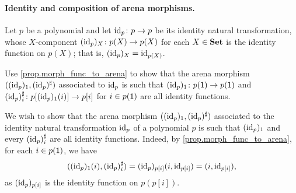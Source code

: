 \documentclass[Book-Poly]{subfiles}
\begin{document}

\paragraph{Identity and composition of arena morphisms.}



\begin{exercise}
Let $p$ be a polynomial and let $\mathrm{id}_p \colon p \to p$ be its identity natural transformation, whose $X$-component $(\mathrm{id}_p)_X \colon p(X) \to p(X)$ for each $X \in \textbf{Set}$ is the identity function on $p(X)$; that is, $(\mathrm{id}_p)_X = \mathrm{id}_{p(X)}$.

Use \cref{prop.morph_func_to_arena} to show that the arena morphism $((\mathrm{id}_p)_1, (\mathrm{id}_p)^\sharp)$ associated to $\mathrm{id}_p$ is such that $(\mathrm{id}_p)_1 \colon p(\textsf{1}) \to p(\textsf{1})$ and $(\mathrm{id}_p)^\sharp_i \colon p[(\mathrm{id}_p)_1(i)] \to p[i]$ for $i \in p(\textsf{1})$ are all identity functions.
\begin{solution}
We wish to show that the arena morphism $((\mathrm{id}_p)_1, (\mathrm{id}_p)^\sharp)$ associated to the identity natural transformation $\mathrm{id}_p$ of a polynomial $p$ is such that $(\mathrm{id}_p)_1$ and every $(\mathrm{id}_p)^\sharp_i$ are all identity functions.
Indeed, by \cref{prop.morph_func_to_arena}, for each $i \in p(\textsf{1})$, we have
\[
    ((\mathrm{id}_p)_1(i), (\mathrm{id}_p)^\sharp_i) = (\mathrm{id}_p)_{p[i]}(i, \mathrm{id}_{p[i]}) = (i, \mathrm{id}_{p[i]}),
\]
as $(\mathrm{id}_p)_{p[i]}$ is the identity function on $p(p[i])$.
\end{solution}
\end{exercise}
\end{document}
